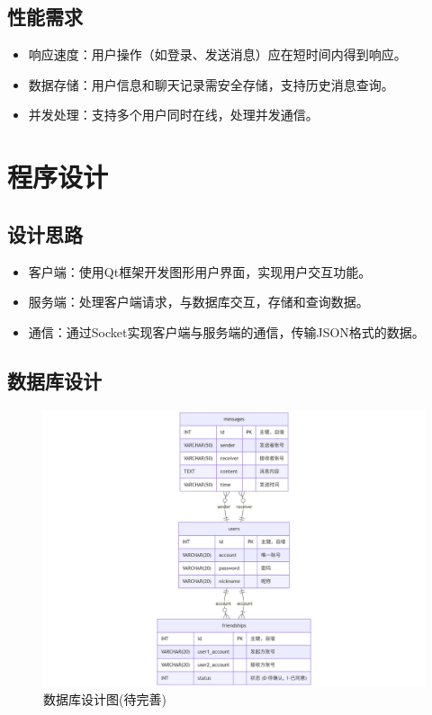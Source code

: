 \documentclass[UTF8]{ctexart}
\begin{document}
\subsection{性能需求}
\begin{itemize}
	\item 响应速度：用户操作（如登录、发送消息）应在短时间内得到响应。
	\item 数据存储：用户信息和聊天记录需安全存储，支持历史消息查询。
	\item 并发处理：支持多个用户同时在线，处理并发通信。
\end{itemize}
	
\section{程序设计}
\subsection{设计思路}
\begin{itemize}
	\item 客户端：使用Qt框架开发图形用户界面，实现用户交互功能。
	\item 服务端：处理客户端请求，与数据库交互，存储和查询数据。
	\item 通信：通过Socket实现客户端与服务端的通信，传输JSON格式的数据。
\end{itemize}
\subsection{数据库设计}
\begin{figure}[h]
	\centering
	\includegraphics[width=1\textwidth]{sql}
	\caption{数据库设计图(待完善)}
\end{figure}
\end{document}
